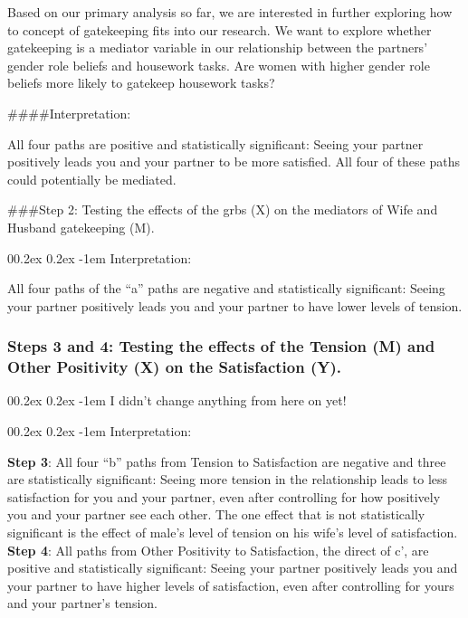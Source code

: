 \documentclass[
  man,floatsintext]{apa6}
\makeatletter
\let\oldparagraph\paragraph
\renewcommand{\paragraph}[1]{\oldparagraph{#1}\mbox{}}
\renewcommand{\paragraph}{\@startsection{paragraph}{4}{\parindent}%
  {0\baselineskip \@plus 0.2ex \@minus 0.2ex}%
  {-1em}%
  {\normalfont\normalsize\bfseries\itshape\typesectitle}}
\makeatother
\begin{document}
Based on our primary analysis so far, we are interested in further exploring how to concept of gatekeeping fits into our research. We want to explore whether gatekeeping is a mediator variable in our relationship between the partners' gender role beliefs and housework tasks. Are women with higher gender role beliefs more likely to gatekeep housework tasks?

\#\#\#\#Interpretation:

All four paths are positive and statistically significant: Seeing your partner positively leads you and your partner to be more satisfied. All four of these paths could potentially be mediated.

\#\#\#Step 2: Testing the effects of the grbs (X) on the mediators of Wife and Husband gatekeeping (M).

\hypertarget{interpretation}{%
\paragraph{Interpretation:}\label{interpretation}}

All four paths of the ``a'' paths are negative and statistically significant: Seeing your partner positively leads you and your partner to have lower levels of tension.

\hypertarget{steps-3-and-4-testing-the-effects-of-the-tension-m-and-other-positivity-x-on-the-satisfaction-y.}{%
\subsubsection{Steps 3 and 4: Testing the effects of the Tension (M) and Other Positivity (X) on the Satisfaction (Y).}\label{steps-3-and-4-testing-the-effects-of-the-tension-m-and-other-positivity-x-on-the-satisfaction-y.}}

\hypertarget{i-didnt-change-anything-from-here-on-yet}{%
\paragraph{I didn't change anything from here on yet!}\label{i-didnt-change-anything-from-here-on-yet}}

\hypertarget{interpretation-1}{%
\paragraph{Interpretation:}\label{interpretation-1}}

\textbf{Step 3}: All four ``b'' paths from Tension to Satisfaction are negative and three are statistically significant: Seeing more tension in the relationship leads to less satisfaction for you and your partner, even after controlling for how positively you and your partner see each other. The one effect that is not statistically significant is the effect of male's level of tension on his wife's level of satisfaction.\\
\textbf{Step 4}: All paths from Other Positivity to Satisfaction, the direct of c', are positive and statistically significant: Seeing your partner positively leads you and your partner to have higher levels of satisfaction, even after controlling for yours and your partner's tension.
\end{document}
